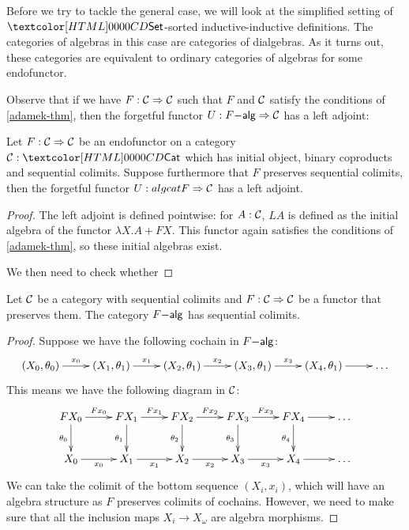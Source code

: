 Before we try to tackle the general case, we will look at the
simplified setting of $\Set$-sorted inductive-inductive
definitions. The categories of algebras in this case are categories of
dialgebras. As it turns out, these categories are equivalent to
ordinary categories of algebras for some endofunctor.

Observe that if we have $F : \mathcal{C} \Rightarrow \mathcal{C}$ such that $F$ and $\mathcal{C}$
satisfy the conditions of \cref{adamek-thm}, then the forgetful
functor $U : F\mathsf{-alg} \Rightarrow \mathcal{C}$ has a left adjoint:

\begin{proposition}
  Let $F : \mathcal{C} \Rightarrow \mathcal{C}$ be an endofunctor on a category
  $\Cc : \Cat$ which has initial object, binary coproducts and
  sequential colimits. Suppose furthermore that $F$ preserves
  sequential colimits, then the forgetful functor
  $U : algcat{F} \Rightarrow \mathcal{C}$ has a left adjoint.
\end{proposition}

\begin{proof}
  The left adjoint is defined pointwise: for $A : \mathcal{C}$, $L A$ is
  defined as the initial algebra of the functor $\lambda X . A + FX$.
  This functor again satisfies the conditions of \cref{adamek-thm}, so
  these initial algebras exist.

  We then need to check whether 
  
  
\end{proof}

\begin{proposition}
  Let $\mathcal{C}$ be a category with sequential colimits and
  $F : \mathcal{C} \Rightarrow \mathcal{C}$ be a functor that preserves them. The category
  $F\mathsf{-alg}$ has sequential colimits.
\end{proposition}

\begin{proof}
  Suppose we have the following cochain in $F\mathsf{-alg}$:
  $$
  \xymatrix{
    (X_0,\theta_0) \ar[r]^{x_0}
    &(X_1,\theta_1) \ar[r]^{x_1} 
    &(X_2,\theta_1) \ar[r]^{x_2} 
    &(X_3,\theta_1) \ar[r]^{x_3}
    &(X_4,\theta_1) \ar[r]
    &\hdots
  }
  $$
  This means we have the following diagram in $\mathcal{C}$:
  $$
  \xymatrix{
    F X_0 \ar[r]^{F x_0} \ar[d]_{\theta_0}
    &F X_1 \ar[r]^{F x_1} \ar[d]_{\theta_1}
    &F X_2 \ar[r]^{F x_2} \ar[d]_{\theta_2}
    &F X_3 \ar[r]^{F x_3} \ar[d]_{\theta_3}
    &F X_4 \ar[r] \ar[d]_{\theta_4} 
    &\hdots
    \\
    X_0 \ar[r]_{x_0}
    &X_1 \ar[r]_{x_1}
    &X_2 \ar[r]_{x_2}
    &X_3 \ar[r]_{x_3}
    &X_4 \ar[r]
    &\hdots
  }
  $$
  We can take the colimit of the bottom sequence $(X_i,x_i)$, which
  will have an algebra structure as $F$ preserves colimits of
  cochains. However, we need to make sure that all the inclusion maps
  $X_i \to X_\omega$ are algebra morphisms.
\end{proof}

